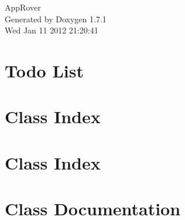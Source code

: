\documentclass[a4paper]{book}
\begin{document}
\begin{titlepage}
\vspace*{7cm}
\begin{center}
{\Large AppRover }\\
\vspace*{1cm}
{\large Generated by Doxygen 1.7.1}\\
\vspace*{0.5cm}
{\small Wed Jan 11 2012 21:20:41}\\
\end{center}
\end{titlepage}
\clearemptydoublepage
{}
\tableofcontents
\clearemptydoublepage
{}
\chapter{Todo List}
\label{todo}

\chapter{Class Index}

\chapter{Class Index}

\chapter{Class Documentation}


























\printindex
\end{document}
